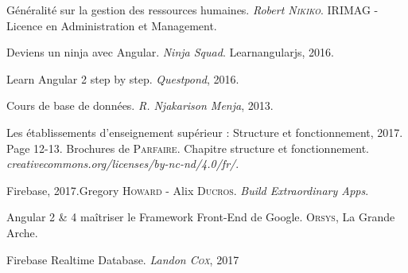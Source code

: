 
\begin{thebibliography}{Xyz12}
	Généralité sur la gestion des ressources humaines. \emph{Robert \textsc{Nikiko}}. IRIMAG - Licence en Administration et Management.
	\medskip
	
	Deviens un ninja avec Angular. \emph{Ninja Squad}. Learnangularjs, 2016.
	\medskip
	
	Learn Angular 2 step by step. \emph{Questpond}, 2016.
	\medskip
	
	Cours de base de données. \emph{R. Njakarison Menja}, 2013.
	\medskip
	
	Les établissements d'enseignement supérieur : Structure et fonctionnement, 2017. Page 12-13. Brochures de \textsc{Parfaire}. Chapitre structure et fonctionnement. \emph{creativecommons.org/licenses/by-nc-nd/4.0/fr/}.
	\medskip
	
	Firebase, 2017.Gregory \textsc{Howard} - Alix \textsc{Ducros}.  \emph{Build Extraordinary Apps}.
	\medskip
	
	Angular 2 \& 4 maîtriser le Framework Front-End de Google. \textsc{Orsys}, La Grande Arche.
	\medskip
	
	Firebase Realtime Database. \emph{Landon \textsc{Cox}}, 2017
	\medskip
	
\end{thebibliography}

\newpage

